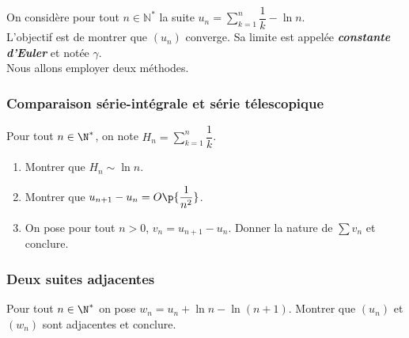 On considère pour tout $n\in\mathbb N^\ast$ la suite $u_n=\displaystyle\sum_{k=1}^n \dfrac1k -\ln n$.\\
L'objectif est de montrer que $(u_n)$ converge. Sa limite est appelée \textbf{\emph{constante d'Euler}} et notée $\gamma$.\\
Nous allons employer deux méthodes.

\subsubsection{Comparaison série-intégrale et série télescopique}

Pour tout $n\in\N^\ast$, on note $H_n=\displaystyle\sum_{k=1}^n\dfrac1k$.
\begin{enumerate}
 \item Montrer que $H_n\sim \ln n$.
 \item Montrer que $u_{n+1}-u_n=O\p{\dfrac1{n^2}}$.
 \item On pose pour tout $n>0$, $v_n=u_{n+1}-u_n$. Donner la nature de $\displaystyle\sum v_n$ et conclure.
\end{enumerate}

\subsubsection{Deux suites adjacentes}

Pour tout $n\in\N^\ast$ on pose $w_n=u_n+\ln n-\ln(n+1)$. Montrer que $(u_n)$ et $(w_n)$ sont adjacentes et conclure.
